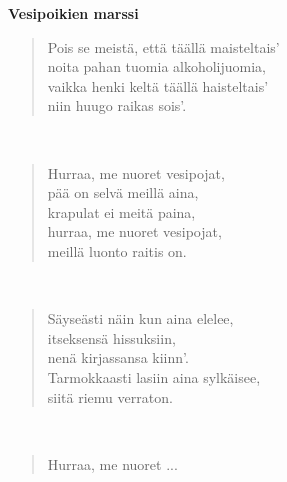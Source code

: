 %
%
\noindent\begin{minipage}{\linewidth}
\vspace{5pt}
\parbox[t]{0.85\linewidth}{\raggedright {\large\bf Vesipoikien marssi}\\[6pt]}
\begin{verse}
	Pois se meistä, että täällä maisteltais'\\
	noita pahan tuomia alkoholijuomia,\\
	vaikka henki keltä täällä haisteltais'\\
	niin huugo raikas sois'.\\
\end{verse}
\end{minipage}\\[10pt]
\noindent\begin{minipage}{\linewidth}
\begin{verse}
	Hurraa, me nuoret vesipojat,\\
	pää on selvä meillä aina,\\
	krapulat ei meitä paina,\\
	hurraa, me nuoret vesipojat,\\
	meillä luonto raitis on.\\
\end{verse}
\end{minipage}\\[10pt]
\noindent\begin{minipage}{\linewidth}
\begin{verse}
	Säyseästi näin kun aina elelee,\\
	itseksensä hissuksiin,\\
	nenä kirjassansa kiinn'.\\
	Tarmokkaasti lasiin aina sylkäisee,\\
	siitä riemu verraton.\\
\end{verse}
\end{minipage}\\[10pt]
\noindent\begin{minipage}{\linewidth}
\begin{verse}
	Hurraa, me nuoret ...\\
\end{verse}
\end{minipage}\\[10pt]

